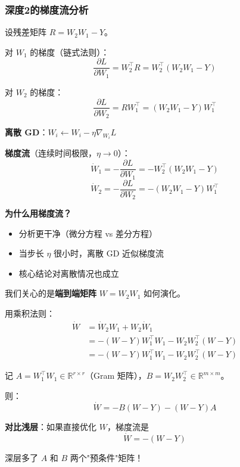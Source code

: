 \documentclass[12pt, a4paper]{ctexart}
\begin{document}
\subsubsection{深度2的梯度流分析}

\begin{blackboard}

设残差矩阵 $R = W_2 W_1 - Y$。

对 $W_1$ 的梯度（链式法则）：
\[
\frac{\partial L}{\partial W_1} = W_2^\top R = W_2^\top (W_2 W_1 - Y)
\]

对 $W_2$ 的梯度：
\[
\frac{\partial L}{\partial W_2} = R W_1^\top = (W_2 W_1 - Y) W_1^\top
\]

\end{blackboard}

\begin{blackboard}

\textbf{离散 GD}：$W_i \leftarrow W_i - \eta \nabla_{W_i} L$

\textbf{梯度流}（连续时间极限，$\eta \to 0$）：
\[
\dot{W}_1 = -\frac{\partial L}{\partial W_1} = -W_2^\top (W_2 W_1 - Y)
\]
\[
\dot{W}_2 = -\frac{\partial L}{\partial W_2} = -(W_2 W_1 - Y) W_1^\top
\]

\textbf{为什么用梯度流？}
\begin{itemize}
    \item 分析更干净（微分方程 vs 差分方程）
    \item 当步长 $\eta$ 很小时，离散 GD 近似梯度流
    \item 核心结论对离散情况也成立
\end{itemize}

\end{blackboard}

\begin{blackboard}[Step 3：$W = W_2 W_1$ 的演化]

我们关心的是\textbf{端到端矩阵} $W = W_2 W_1$ 如何演化。

用乘积法则：
\begin{align*}
\dot{W} &= \dot{W}_2 W_1 + W_2 \dot{W}_1 \\
&= -(W - Y) W_1^\top W_1 - W_2 W_2^\top (W - Y) \\
&= -(W - Y) W_1^\top W_1 - W_2 W_2^\top (W - Y)
\end{align*}

记 $A = W_1^\top W_1 \in \mathbb{R}^{r \times r}$（Gram 矩阵），$B = W_2 W_2^\top \in \mathbb{R}^{m \times m}$。

则：
\[
\boxed{\dot{W} = -B(W - Y) - (W - Y)A}
\]

\textbf{对比浅层}：如果直接优化 $W$，梯度流是
\[
\dot{W} = -(W - Y)
\]

深层多了 $A$ 和 $B$ 两个"预条件"矩阵！

\end{blackboard}
\end{document}
